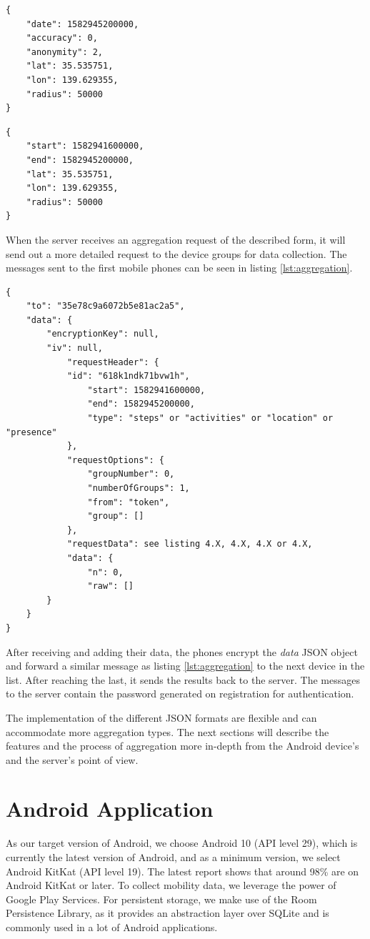\begin{lstlisting}[caption=Search options for locations, label={lst:locations}]
{
    "date": 1582945200000,
    "accuracy": 0,
    "anonymity": 2,
    "lat": 35.535751,
    "lon": 139.629355,
    "radius": 50000
}
\end{lstlisting}

\begin{lstlisting}[caption=Search options for presence, label={lst:presence}]
{
    "start": 1582941600000,
    "end": 1582945200000,
    "lat": 35.535751,
    "lon": 139.629355,
    "radius": 50000
}
\end{lstlisting}


When the server receives an aggregation request of the described form, it will send out a more detailed request to the device groups for data collection. The messages sent to the first mobile phones can be seen in listing \ref{lst:aggregation}.

\begin{lstlisting}[caption=First aggregation request sent to the groups, label={lst:aggregation}]
{
	"to": "35e78c9a6072b5e81ac2a5",
	"data": {
		"encryptionKey": null,
		"iv": null,
            "requestHeader": {
			"id": "618k1ndk71bvw1h",
                "start": 1582941600000,
                "end": 1582945200000,
                "type": "steps" or "activities" or "location" or "presence"
            },
            "requestOptions": {
                "groupNumber": 0,
                "numberOfGroups": 1,
                "from": "token",
                "group": []
            },
            "requestData": see listing 4.X, 4.X, 4.X or 4.X,
            "data": {
                "n": 0,
                "raw": []
		}
	}
}
\end{lstlisting}

After receiving and adding their data, the phones encrypt the \textit{data} JSON object and forward a similar message as listing \ref{lst:aggregation} to the next device in the list. After reaching the last, it sends the results back to the server. The messages to the server contain the password generated on registration for authentication.

The implementation of the different JSON formats are flexible and can accommodate more aggregation types. The next sections will describe the features and the process of aggregation more in-depth from the Android device's and the server's point of view.

\section{Android Application}
As our target version of Android, we choose Android 10 (API level 29), which is currently the latest version of Android, and as a minimum version, we select Android KitKat (API level 19). The latest report shows that around 98\% are on Android KitKat or later. To collect mobility data, we leverage the power of Google Play Services. For persistent storage, we make use of the Room Persistence Library, as it provides an abstraction layer over SQLite and is commonly used in a lot of Android applications.

